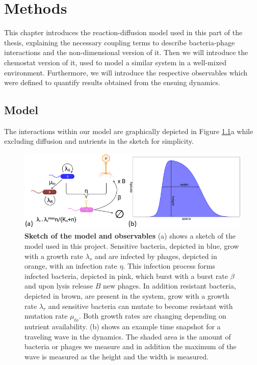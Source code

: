 \chapter{Methods}
\label{chap:phage_methods}

This chapter introduces the reaction-diffusion model used in this part of the thesis, explaining the necessary coupling terms to describe bacteria-phage interactions and the non-dimensional version of it. Then we will introduce the chemostat version of it, used to model a similar system in a well-mixed environment. Furthermore, we will introduce the respective observables which were defined to quantify results obtained from the ensuing dynamics.
\section{Model}
The interactions within our model are graphically depicted in Figure \ref{fig:model_sketch}a while excluding diffusion and nutrients in the sketch for simplicity.
\begin{figure}
\centering
\includegraphics[width=\linewidth]{graphics/2025_09_26_phages_fig1.png}
\caption{\textbf{Sketch of the model and observables} (a) shows a sketch of the model used in this project. Sensitive bacteria, depicted in blue, grow with a growth rate $\lambda_s$ and are infected by phages, depicted in orange, with an infection rate $\eta$. This infection process forms infected bacteria, depicted in pink, which burst with a burst rate $\beta$ and upon lysis release $B$ new phages. In addition resistant bacteria, depicted in brown, are present in the system, grow with a growth rate $\lambda_r$ and sensitive bacteria can mutate to become resistant with mutation rate $\mu_{to}$. Both growth rates are changing depending on nutrient availability. (b) shows an example time snapshot for a traveling wave in the dynamics. The shaded area is the amount of bacteria or phages we measure and in addition the maximum of the wave is measured as the height and the width is measured.}
\label{fig:model_sketch}
\end{figure}
